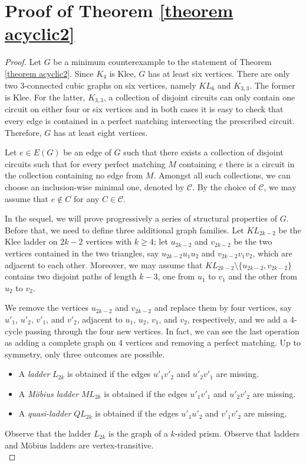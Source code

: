 \documentclass[]{theclass}
\begin{document}
\section{Proof of Theorem \ref{theorem acyclic2}}

\begin{proof}
Let $G$ be a minimum counterexample to the statement of Theorem \ref{theorem acyclic2}. Since $K_4$ is Klee, $G$ has at least six vertices. There are only two 3-connected cubic graphs on six vertices, namely $KL_6$ and $K_{3,3}$. The former is Klee. For the latter, $K_{3,3}$, a collection of disjoint circuits can only contain one circuit on either four or six vertices and in both cases it is easy to check that every edge is contained in a perfect matching intersecting the prescribed circuit. Therefore, $G$ has at least eight vertices.

Let $e\in E(G)$ be an edge of $G$ such that there exists a collection of disjoint circuits such that for every perfect matching $M$ containing $e$ there is a circuit in the collection containing no edge from $M$. Amongst all such collections, we can choose an inclusion-wise minimal one, denoted by $\mathcal{C}$. 
By the choice of $\mathcal{C}$, we may assume that $e\notin C$ for any $C\in\mathcal{C}$. 

In the sequel, we will prove progressively a series of structural properties of $G$. Before that, we need to define three additional graph families. Let $KL_{2k-2}$ be the Klee ladder on $2k-2$ vertices with $k\ge 4$; let $u_{2k-2}$ and $v_{2k-2}$ be the two vertices contained in the two triangles, say $u_{2k-2}u_1u_2$ and $v_{2k-2}v_1v_2$, which are adjacent to each other. Moreover, we may assume that $KL_{2k-2} \setminus \{u_{2k-2},v_{2k-2}\}$ contains two disjoint paths of length $k-3$, one from $u_1$ to $v_1$ and the other from $u_2$ to $v_2$.

We remove the vertices $u_{2k-2}$ and $v_{2k-2}$ and replace them by four vertices, say $u'_1$, $u'_2$, $v'_1$, and $v'_2$, adjacent to $u_1$, $u_2$, $v_1$, and $v_2$, respectively, and we add a 4-cycle passing through the four new vertices. In fact, we can see the last operation as adding a complete graph on 4 vertices and removing a perfect matching. Up to symmetry, only three outcomes are possible.

\begin{itemize}
    \item A \emph{ladder} $L_{2k}$ is obtained if the edges $u'_1v'_2$ and $u'_2v'_1$ are missing.
    \item A \emph{M\"obius ladder} $ML_{2k}$ is obtained if the edges $u'_1v'_1$ and $u'_2v'_2$ are missing.
    \item A \emph{quasi-ladder} $QL_{2k}$ is obtained if the edges $u'_1u'_2$ and $v'_1v'_2$ are missing.
\end{itemize}
Observe that the ladder $L_{2k}$ is the graph of a $k$-sided prism. Observe that ladders and M\"obius ladders are vertex-transitive.\\


\end{proof}
\end{document}
